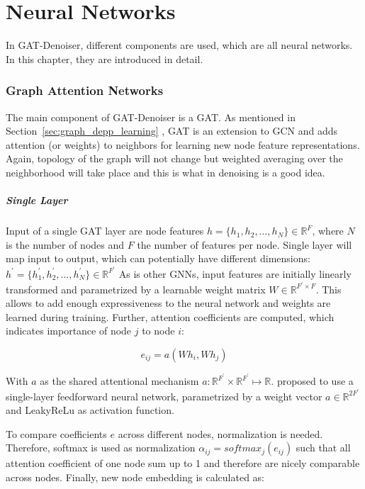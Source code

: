 \chapter{Neural Networks}

In GAT-Denoiser, different components are used, which are all neural networks.
In this chapter, they are introduced in detail.

\subsection{Graph Attention Networks}
The main component of GAT-Denoiser is a GAT.
As mentioned in Section~\ref{sec:graph_depp_learning} \textit{}, GAT is an extension to GCN and 
adds attention (or weights) to neighbors for learning new node feature representations. 
Again, topology of the graph will not change but weighted averaging over the neighborhood 
will take place and this is what in denoising is a good idea.

\paragraph{Single Layer}
Input of a single GAT layer are node features $h = \{ h_1, h_2, \dots , h_N \} \in \mathbb{R}^F$, 
where $N$ is the number of nodes and $F$ the number of features per node. 
Single layer will map input to output, which can potentially have different dimensions: 
$h^{\prime} = \{ h_1^{\prime}, h_2^{\prime}, \dots, h_N^{\prime} \} \in \mathbb{R}^{F^{\prime}} $
As is other GNNs, input features are initially linearly transformed and parametrized by a learnable weight matrix 
$W \in \mathbb{R}^{F^{\prime} \times F}$. 
This allows to add enough expressiveness to the neural network and weights are learned during training.
Further, attention coefficients are computed, which indicates importance of node $j$ to node $i$:

\begin{equation}
  e_{ij} = a(Wh_i, Wh_j)
\end{equation}

With $a$ as the shared attentional mechanism $a : \mathbb{R}^{F^{\prime}} \times \mathbb{R}^{F^{\prime}} \mapsto \mathbb{R}$.
\citet{GAT} proposed to use a single-layer feedforward neural network, parametrized by a weight vector $a \in \mathbb{R}^{2F^{\prime}}$
and LeakyReLu as activation function.

To compare coefficients $e$ across different nodes, normalization is needed.
Therefore, softmax is used as normalization $\alpha_{ij} = softmax_j(e_{ij})$ 
such that all attention coefficient of one node sum up to 1 and therefore are nicely comparable across nodes.
Finally, new node embedding is calculated as:

